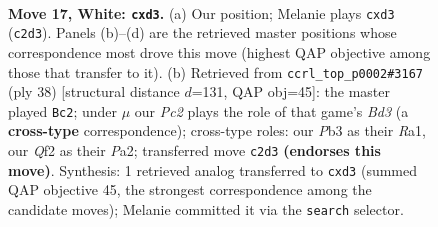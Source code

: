 \documentclass[11pt]{article}
\begin{document}
\clearpage

\begin{figure}[p]\centering
\begin{subfigure}{0.46\textwidth}\centering
\resizebox{\linewidth}{!}{%
\newchessgame
\chessboard[
  setfen={r3kb1r/1p1bpp1n/1B1p2p1/qN5p/4P3/1PNn1P2/P1P2QPP/2K1R2R w kq - 0 17},
  showmover=false,
  pgfstyle=straightmove, color=movearrow, markmove={c2-d3}
]}
\caption{}
\end{subfigure}\hfill
\begin{subfigure}{0.46\textwidth}\centering
\resizebox{\linewidth}{!}{%
\newchessgame
\chessboard[
  setfen={2r2rk1/4ppbp/2b2np1/p1n1B3/1q2P3/Q1NB1N1P/PP3PP1/R3R1K1 w - - 7 20},
  showmover=false,
  pgfstyle=straightmove, color=movearrow, markmove={d3-c2}
]}
\caption{}
\end{subfigure}
\\[4pt]

\caption{\textbf{Move 17, White: \texttt{cxd3}.} (a) Our position; Melanie plays \texttt{cxd3} (\texttt{c2d3}). Panels (b)--(d) are the retrieved master positions whose correspondence most drove this move (highest QAP objective among those that transfer to it). (b) Retrieved from \texttt{ccrl\_top\_p0002\#3167} (ply 38) [structural distance $d$=131, QAP obj=45]: the master played \texttt{Bc2}; under $\mu$ our \emph{Pc2} plays the role of that game's \emph{Bd3} (a \textbf{cross-type} correspondence); cross-type roles: our \emph{P}b3 as their \emph{R}a1, our \emph{Q}f2 as their \emph{P}a2; transferred move \texttt{c2d3} \textbf{(endorses this move)}. Synthesis: 1 retrieved analog transferred to \texttt{cxd3} (summed QAP objective 45, the strongest correspondence among the candidate moves); Melanie committed it via the \texttt{search} selector.}
\label{fig:thought-m32}
\end{figure}

\clearpage
\end{document}
